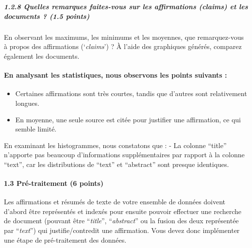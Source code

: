 \documentclass[11pt]{article}
\providecommand{\tightlist}{%
      \setlength{\itemsep}{0pt}\setlength{\parskip}{0pt}}
\begin{document}
    \begin{center}
    \end{center}
    { \hspace*{\fill} \\}
    
    \subparagraph{1.2.8 Quelles remarques faites-vous sur les affirmations
(claims) et les documents ? (1.5
points)}\label{quelles-remarques-faites-vous-sur-les-affirmations-claims-et-les-documents-1.5-points}

En observant les maximums, les minimums et les moyennes, que
remarquez-vous à propos des affirmations (`\emph{claims}') ? À l'aide
des graphiques générés, comparez également les documents.

    \paragraph{En analysant les statistiques, nous observons les points
suivants
:}\label{en-analysant-les-statistiques-nous-observons-les-points-suivants}

\begin{itemize}
\tightlist
\item
  Certaines affirmations sont très courtes, tandis que d'autres sont
  relativement longues.
\item
  En moyenne, une seule source est citée pour justifier une affirmation,
  ce qui semble limité.
\end{itemize}

En examinant les histogrammes, nous constatons que : - La colonne
``title'' n'apporte pas beaucoup d'informations supplémentaires par
rapport à la colonne ``text'', car les distributions de ``text'' et
``abstract'' sont presque identiques.

    \paragraph{1.3 Pré-traitement (6
points)}\label{pruxe9-traitement-6-points}

Les affirmations et résumés de texte de votre ensemble de données
doivent d'abord être représentés et indexés pour ensuite pouvoir
effectuer une recherche de document (pouvant être ``\emph{title}'',
``\emph{abstract}'' ou la fusion des deux représentée par
``\emph{text}'') qui justifie/contredit une affirmation. Vous devez donc
implémenter une étape de pré-traitement des données.
\end{document}
